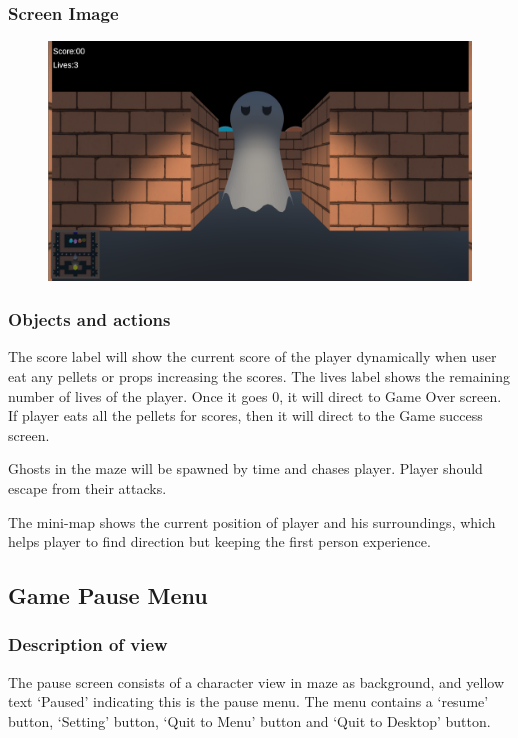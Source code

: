 \documentclass[11pt]{article}
\begin{document}
\subsubsection{Screen Image}
\begin{figure}[H]
    \centering
    \includegraphics*[scale=0.2]{UI2.0InGame.png}
\end{figure}
\subsubsection{Objects and actions}
The score label will show the current score of the player dynamically when user eat any pellets or props increasing the scores. The lives label shows the remaining number of lives of the player. Once it goes 0, it will direct to Game Over screen. If player eats all the pellets for scores, then it will direct to the Game success screen.

Ghosts in the maze will be spawned by time and chases player. Player should escape from their attacks.

The mini-map shows the current position of player and his surroundings, which helps player to find direction but keeping the first person experience.

\subsection{Game Pause Menu}
\subsubsection{Description of view}
The pause screen consists of a character view in maze as background, and yellow text `Paused' indicating this is the pause menu. The menu contains a `resume' button, `Setting' button, `Quit to Menu' button and `Quit to Desktop' button.
\end{document}
